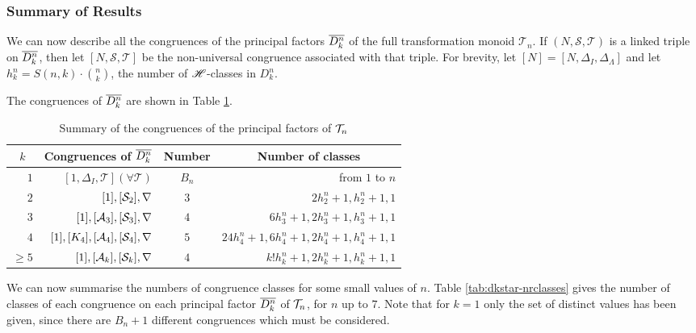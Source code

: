 \subsubsection{Summary of Results}
\label{sec:summary}
We can now describe all the congruences of the principal factors $\overline{D_k^n}$ of
the full transformation monoid $\mathcal{T}_n$.  If
$(N,\mathcal{S},\mathcal{T})$ is a linked triple on $\overline{D_k^n}$, then let
$[N,\mathcal{S},\mathcal{T}]$ be the non-universal congruence associated with
that triple.  For brevity, let $[N] = [N, \Delta_I, \Delta_\Lambda]$ and let
$h_k^n = S(n,k) \cdot \binom{n}{k}$, the number of $\mathrel{\mathscr{H}}$-classes in $D_k^n$.

\begin{theorem}
  \label{thm:dkstar-congs}
  The congruences of $\overline{D_k^n}$ are shown in Table \ref{tab:dkstar-congs}.
  \begin{table}[h]
    \centering
    \renewcommand{\arraystretch}{1.3}
    \begin{tabular}{| r | r | c | r |}
      \hline
      \multicolumn{1}{|c|}{$k$} & \multicolumn{1}{c|}{\textbf{Congruences of $\overline{D_k^n}$}} & \textbf{Number} & \multicolumn{1}{c|}{\textbf{Number of classes}} \\
      \hline
      $1$ & $[1, \Delta_I, \mathcal{T}] (\forall \mathcal{T})$ & $B_n$
          & from $1$ to $n$ \\
      $2$ & $[1], [\mathcal{S}_2], \nabla$ & $3$ & $2h_2^n+1, h_2^n+1, 1$ \\
      $3$ & $[1], [\mathcal{A}_3], [\mathcal{S}_3], \nabla$ & $4$ & $6h_3^n+1, 2h_3^n+1, h_3^n+1, 1$ \\
      $4$ & $[1], [K_4], [\mathcal{A}_4], [\mathcal{S}_4], \nabla$ & $5$ & $24h_4^n+1, 6h_4^n+1, 2h_4^n+1, h_4^n+1, 1$ \\
      $\geq 5$ & $[1], [\mathcal{A}_k], [\mathcal{S}_k], \nabla$ & $4$ & $k!h_k^n+1, 2h_k^n+1, h_k^n+1, 1$ \\
      \hline
    \end{tabular}
    \caption{Summary of the congruences of the principal factors of $\mathcal{T}_n$}
    \label{tab:dkstar-congs}
  \end{table}
\end{theorem}

We can now summarise the numbers of congruence classes for some small values of
$n$.  Table \ref{tab:dkstar-nrclasses} gives the number of classes of each
congruence on each principal factor $\overline{D_k^n}$ of $\mathcal{T}_n$, for $n$ up to $7$.
Note that for $k=1$ only the set of distinct values has been given, since there
are $B_n+1$ different congruences which must be considered.


